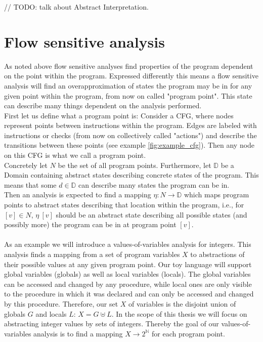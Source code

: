     // TODO: talk about Abstract Interpretation.
  
  \section{Flow sensitive analysis}
    As noted above flow sensitive analyses find properties of the program dependent on the point within the program. Expressed differently this means a flow sensitive analysis will find an overapproximation of states the program may be in for any given point within the program, from now on called "program point". This state can describe many things dependent on the analysis performed.\\
    First let us define what a program point is: Consider a \ac{CFG}, where nodes represent points between instructions within the program. Edges are labeled with instructions or checks (from now on collectively called "actions") and describe the transitions between these points (see example \autoref{fig:example_cfg}). Then any node on this \ac{CFG} is what we call a program point.\\
    Concretely let $N$ be the set of all program points. Furthermore, let $\mathbb{D}$ be a Domain containing abstract states describing concrete states of the program. This means that some $d \in \mathbb{D}$ can describe many states the program can be in.\\ 
    Then an analysis is expected to find a mapping $\eta: N \rightarrow \mathbb{D}$ which maps program points to abstract states describing that location within the program, i.e., for $[v] \in N$, $\eta\ [v]$ should be an abstract state describing all possible states (and possibly more) the program can be in at program point $[v]$.\\
    \\
    As an example we will introduce a values-of-variables analysis for integers. This analysis finds a mapping from a set of program variables $X$ to abstractions of their possible values at any given program point. Our toy language will support global variables (globals) as well as local variables (locals). The global variables can be accessed and changed by any procedure, while local ones are only visible to the procedure in which it was declared and can only be accessed and changed by this procedure. Therefore, our set $X$ of variables is the disjoint union of globals $G$ and locals $L$: $X = G \uplus L$.
    In the scope of this thesis we will focus on abstracting integer values by sets of integers. Thereby the goal of our values-of-variables analysis is to find a mapping $X \rightarrow 2^\mathbb{N}$ for each program point.\\
